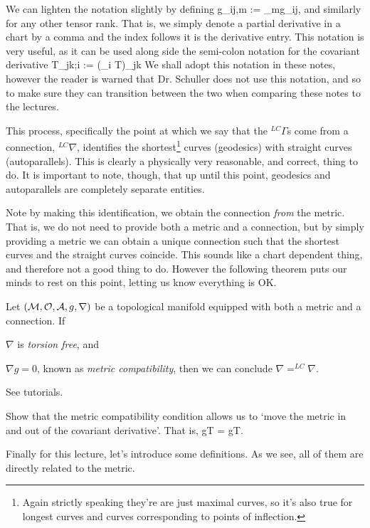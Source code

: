 \bnn 
    We can lighten the notation slightly by defining 
    \bse 
        g_{ij,m} := \p_mg_{ij},
    \ese 
    and similarly for any other tensor rank. That is, we simply denote a partial derivative in a chart by a comma and the index follows it is the derivative entry. This notation is very useful, as it can be used along side the semi-colon notation for the covariant derivative 
    \bse 
        T_{jk;i} := (\nabla_i T)_{jk} 
    \ese 
    We shall adopt this notation in these notes, however the reader is warned that Dr. Schuller does not use this notation, and so to make sure they can transition between the two when comparing these notes to the lectures. 
\enn 

This process, specifically the point at which we say that the $^{LC}\Gamma$s come from a connection, $^{LC}\nabla$, identifies the shortest\footnote{Again strictly speaking they're are just maximal curves, so it's also true for longest curves and curves corresponding to points of inflection.} curves (geodesics) with straight curves (autoparallels). This is clearly a physically very reasonable, and correct, thing to do. It is important to note, though, that up until this point, geodesics and autoparallels are completely separate entities. 

Note by making this identification, we obtain the connection \textit{from} the metric. That is, we do not need to provide both a metric and a connection, but by simply providing a metric we can obtain a unique connection such that the shortest curves and the  straight curves coincide. This sounds like a chart dependent thing, and therefore not a good thing to do. However the following theorem puts our minds to rest on this point, letting us know everything is OK.

\bt 
    Let $(\mathcal{M},\mathcal{O},\mathcal{A},g,\nabla)$ be a topological manifold equipped with both a metric and a connection. If
    \benr 
        \item $\nabla$ is \textit{torsion free}, and 
        \item $\nabla g = 0$, known as \textit{metric compatibility},
    \een 
    then we can conclude $\nabla = ^{LC}\nabla$.
\et 

\bq 
    See tutorials.
\eq 

\bbox 
    Show that the metric compatibility condition allows us to `move the metric in and out of the covariant derivative'. That is, 
    \bse 
        g\cdot \nabla T = \nabla g\cdot T.
    \ese
\ebox 

Finally for this lecture, let's introduce some definitions. As we see, all of them are directly related to the metric.

